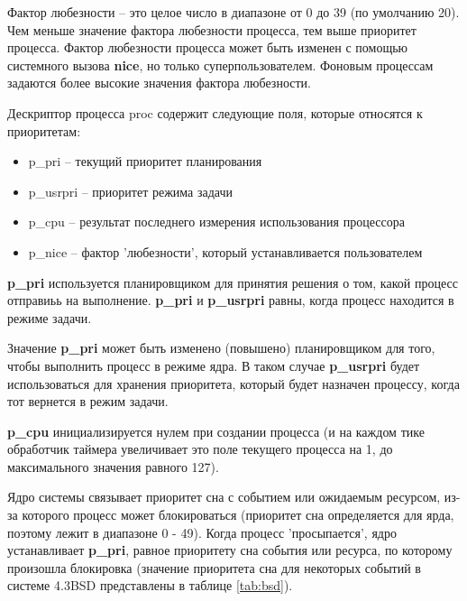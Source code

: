 \noindent Фактор любезности -- это целое число в диапазоне от 0 до 39 (по умолчанию 20). Чем меньше значение фактора любезности процесса, тем выше приоритет процесса. Фактор любезности процесса может быть изменен с помощью системного вызова \textbf{nice}, но только суперпользователем. Фоновым процессам задаются более высокие значения фактора любезности.

Дескриптор процесса proc содержит следующие поля, которые относятся к приоритетам:
\begin{itemize}
	\item p\_pri -- текущий приоритет планирования
	\item p\_usrpri -- приоритет режима задачи
	\item p\_cpu -- результат последнего измерения использования процессора
	\item p\_nice -- фактор 'любезности', который устанавливается пользователем
\end{itemize}

\textbf{p\_pri} используется планировщиком для принятия решения о том, какой процесс отправиьь на выполнение. \textbf{p\_pri} и \textbf{p\_usrpri} равны, когда процесс находится в режиме задачи.

Значение \textbf{p\_pri} может быть изменено (повышено) планировщиком для того, чтобы выполнить процесс в режиме ядра. В таком случае \textbf{p\_usrpri} будет использоваться для хранения приоритета, который будет назначен процессу, когда тот вернется в режим задачи.

\textbf{p\_cpu} инициализируется нулем при создании процесса (и на каждом тике обработчик таймера увеличивает это поле текущего процесса на 1, до максимального значения равного 127).

Ядро системы связывает приоритет сна с событием или ожидаемым ресурсом, из-за которого процесс может блокироваться (приоритет сна определяется для ярда, поэтому лежит в диапазоне 0 - 49). Когда процесс 'просыпается', ядро устанавливает \textbf{p\_pri}, равное приоритету сна события или ресурса, по которому произошла блокировка (значение приоритета сна для некоторых событий в системе 4.3BSD представлены в таблице \ref{tab:bsd}).


